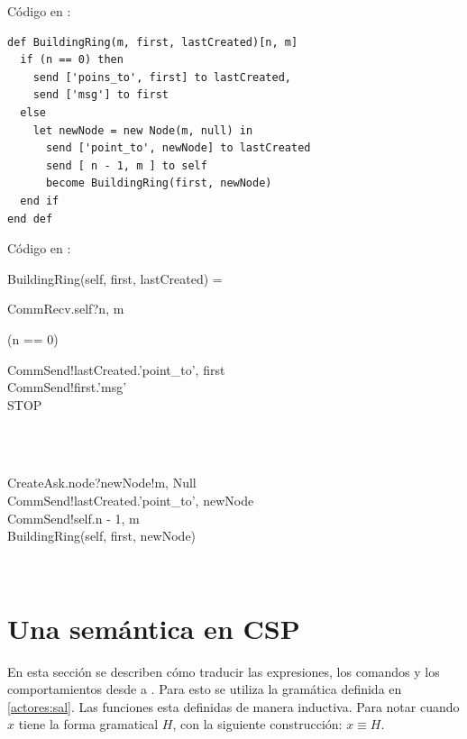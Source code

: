 Código en \SAL:

\begin{lstlisting}[language=sal, style=simple]
def BuildingRing(m, first, lastCreated)[n, m]
  if (n == 0) then
    send ['poins_to', first] to lastCreated,
    send ['msg'] to first
  else
    let newNode = new Node(m, null) in
      send ['point_to', newNode] to lastCreated
      send [ n - 1, m ] to self
      become BuildingRing(first, newNode)
  end if
end def
\end{lstlisting}

Código en \CSP:

\begin{process}
BuildingRing(self, first, lastCreated) = \\ \quad
  \begin{block}
  CommRecv.self?\langle n, m \rangle \then \\ \quad
  \begin{block} 
  \If (n == 0) \Then {} \\ \quad
    \begin{block}
    CommSend!lastCreated.\langle 'point\_to', first \rangle \then \\
    CommSend!first.\langle 'msg' \rangle \then \\
    STOP
    \end{block} \\
  \Else {} \\ \quad
    \begin{block} 
    CreateAsk.node?newNode!\langle m, Null \rangle \then \\
    CommSend!lastCreated.\langle 'point\_to', newNode \rangle \then \\
    CommSend!self.\langle n - 1, m \rangle \then \\
    BuildingRing(self, first, newNode) 
    \end{block} \\
  \end{block} 
\end{block}
\end{process}

\section{Una semántica en CSP}

En esta sección se describen cómo traducir las expresiones, los comandos y los comportamientos desde \SAL a \CSP. Para esto se utiliza la gramática definida en \ref{actores:sal}. Las funciones esta definidas de manera inductiva.
Para notar cuando $x$ tiene la forma gramatical $H$, con la siguiente construcción: $x \equiv H$. 


